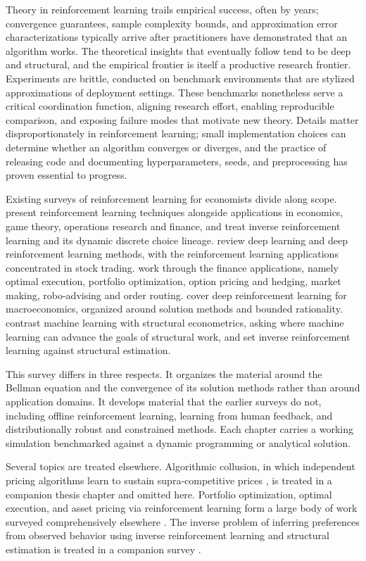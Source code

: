 Theory in reinforcement learning trails empirical success, often by years; convergence guarantees, sample complexity bounds, and approximation error characterizations typically arrive after practitioners have demonstrated that an algorithm works. The theoretical insights that eventually follow tend to be deep and structural, and the empirical frontier is itself a productive research frontier. Experiments are brittle, conducted on benchmark environments that are stylized approximations of deployment settings. These benchmarks nonetheless serve a critical coordination function, aligning research effort, enabling reproducible comparison, and exposing failure modes that motivate new theory. Details matter disproportionately in reinforcement learning; small implementation choices can determine whether an algorithm converges or diverges, and the practice of releasing code and documenting hyperparameters, seeds, and preprocessing has proven essential to progress.

Existing surveys of reinforcement learning for economists divide along scope. \citet{CharpentierElieRemlinger2021} present reinforcement learning techniques alongside applications in economics, game theory, operations research and finance, and treat inverse reinforcement learning and its dynamic discrete choice lineage. \citet{MosaviEtAl2020} review deep learning and deep reinforcement learning methods, with the reinforcement learning applications concentrated in stock trading. \citet{HamblyXuYang2023} work through the finance applications, namely optimal execution, portfolio optimization, option pricing and hedging, market making, robo-advising and order routing. \citet{AtashbarShi2022} cover deep reinforcement learning for macroeconomics, organized around solution methods and bounded rationality. \citet{iskhakov2021} contrast machine learning with structural econometrics, asking where machine learning can advance the goals of structural work, and set inverse reinforcement learning against structural estimation.

This survey differs in three respects. It organizes the material around the Bellman equation and the convergence of its solution methods rather than around application domains. It develops material that the earlier surveys do not, including offline reinforcement learning, learning from human feedback, and distributionally robust and constrained methods. Each chapter carries a working simulation benchmarked against a dynamic programming or analytical solution.

Several topics are treated elsewhere. Algorithmic collusion, in which independent pricing algorithms learn to sustain supra-competitive prices \citep{Calvano2020}, is treated in a companion thesis chapter \citep{Rawat2026collusion} and omitted here. Portfolio optimization, optimal execution, and asset pricing via reinforcement learning form a large body of work surveyed comprehensively elsewhere \citep{HamblyXuYang2023}. The inverse problem of inferring preferences from observed behavior using inverse reinforcement learning and structural estimation is treated in a companion survey \citep{RustRawat2026}.

